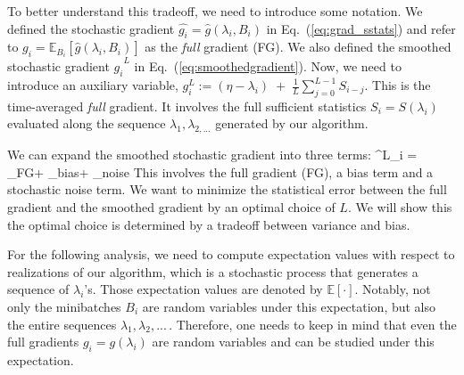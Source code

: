 \documentclass{article} %
\begin{document}
To better understand this tradeoff, we need to introduce some notation.
We defined the stochastic gradient $\hat{g_i} = \hat{g}(\lambda_i,B_i)$ in Eq.~(\ref{eq:grad_sstats}) and refer to $g_i = {\mathbb{E}_{B_i}[\hat{g}(\lambda_i,B_i)]}$ as the \textit{full} gradient (FG).
We also defined the smoothed stochastic gradient
$\hat{g_i}^L$ in Eq.~(\ref{eq:smoothedgradient}). Now, we need to introduce an auxiliary variable, $g^L_i  :=  (\eta - \lambda_i) \; + \; \frac{1}{L} \sum_{j=0}^{L-1} S_{i-j} $.
This is the time-averaged \textit{full} gradient.
It involves the full sufficient statistics $S_i = S(\lambda_i)$ evaluated along the sequence $\lambda_1, \lambda_{2, ...}$ generated by our algorithm.

We can expand the smoothed stochastic gradient into three terms:
\be
{}^L_i  = _{\rm FG}+\; _{\rm bias}\;+\; _{\rm noise} \label{eq:decomp}
\ee
This involves the full gradient (FG), a bias term and a stochastic noise term. We want to minimize the statistical error between the full gradient and the smoothed gradient
by an optimal choice of $L$. We will show this the optimal choice is determined by a tradeoff between variance and bias.

For the following analysis, we need to compute expectation values
with respect to realizations of our algorithm, which is a stochastic process that generates a sequence of $\lambda_i$'s. Those expectation values are denoted by ${\mathbb E}[\cdot ]$. Notably,
not only the minibatches $B_i$ are random variables under this expectation, but also the entire sequences $\lambda_1, \lambda_2, ... $\,.
Therefore, one needs to keep in mind that even the full gradients $g_i = g(\lambda_i)$ are random variables and can be studied under this expectation.
\end{document}
